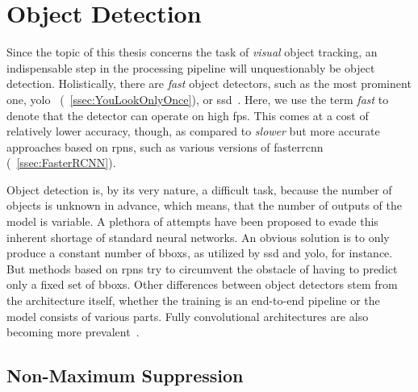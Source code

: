 \section{Object Detection}
\label{sec:ObjectDetection}

Since the topic of this thesis concerns the task of \emph{visual} object tracking, an indispensable step in the processing pipeline will unquestionably be object detection. Holistically, there are \emph{fast} object detectors, such as the most prominent one, \gls{yolo}~\cite{redmon2016yolo} (\sectiontext{}~\ref{ssec:YouLookOnlyOnce}), or \gls{ssd}~\cite{liu2016ssd}. Here, we use the term \emph{fast} to denote that the detector can operate on high \gls{fps}. This comes at a cost of relatively lower accuracy, though, as compared to \emph{slower} but more accurate approaches based on \glspl{rpn}, such as various versions of \gls{fasterrcnn} (\sectiontext{}~\ref{ssec:FasterRCNN}).

Object detection is, by its very nature, a difficult task, because the number of objects is unknown in advance, which means, that the number of outputs of the model is variable. A plethora of attempts have been proposed to evade this inherent shortage of standard neural networks. An obvious solution is to only produce a constant number of \glspl{bbox}, as utilized by \gls{ssd} and \gls{yolo}, for instance. But methods based on \glspl{rpn} try to circumvent the obstacle of having to predict only a fixed set of \glspl{bbox}. Other differences between object detectors stem from the architecture itself, whether the training is an end-to-end pipeline or the model consists of various parts. Fully convolutional architectures are also becoming more prevalent~\cite{tian2019fcos}.

\subsection{Non-Maximum Suppression}
\label{ssec:NonMaximumSuppression}

